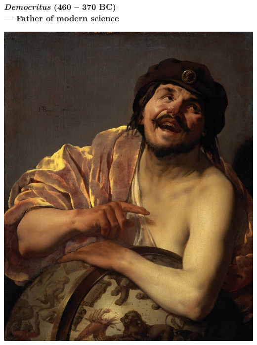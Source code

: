 \documentclass[9pt]{beamer}
\begin{document}
\begin{frame}[fragile] %
  \frametitle{{\it Democritus} (460 -- 370 BC) \\ --- Father of modern science}
  \begin{center}
    \includegraphics[scale=0.09]{./figs/Democritus.jpg} \qquad

\end{center}
\end{frame}
\end{document}
